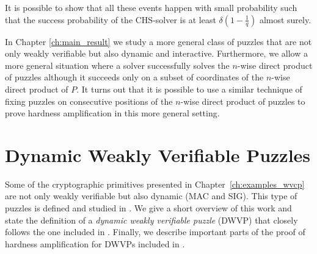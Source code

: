 It is possible to show that all these events happen with small probability such that
the success probability of the CHS-solver is at least $\delta(1\!-\!\frac{1}{q})$ almost surely.

In Chapter \ref{ch:main_result} we study a more general class of puzzles that are not only weakly verifiable but also dynamic and interactive.
Furthermore, we allow a more general situation where a solver successfully solves the $n$-wise direct product of puzzles
although it succeeds only on a subset of coordinates of the $n$-wise direct product of $P$.
It turns out that it is possible to use a similar technique of fixing puzzles on consecutive positions of the $n$-wise direct product of
puzzles to prove hardness amplification in this more general setting.
%
\section{Dynamic Weakly Verifiable Puzzles}
\label{section:dijk}
Some of the cryptographic primitives presented in Chapter~\ref{ch:examples_wvcp}
are not only weakly verifiable but also dynamic (MAC and SIG). This type of puzzles is defined and studied in \cite{Dodis:2009:SAI:1530441.1530450}.
We give a short overview of this work and state the definition of a \textit{dynamic weakly verifiable puzzle} (DWVP) that closely follows
the one included in \cite{Dodis:2009:SAI:1530441.1530450}.
Finally, we describe important parts of the proof of hardness amplification for DWVPs included in \cite{Dodis:2009:SAI:1530441.1530450}.

